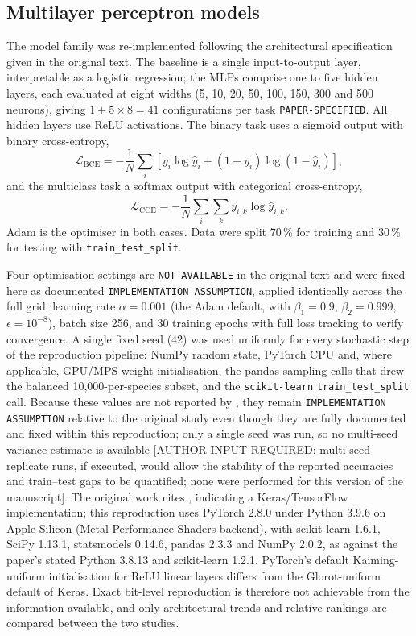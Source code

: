\documentclass[10pt,twocolumn,a4paper]{article}
\newcommand{\evc}[1]{{\footnotesize\texttt{#1}}}
\begin{document}
\subsection{Multilayer perceptron models}
\label{sec:methods-mlp}

The model family was re-implemented following the architectural specification given in the
original text. The baseline is a single
input-to-output layer, interpretable as a logistic regression; the MLPs comprise one to five hidden
layers, each evaluated at eight widths (5, 10, 20, 50, 100, 150, 300 and 500 neurons), giving
$1+5\times8=41$ configurations per task \evc{PAPER-SPECIFIED}. All hidden layers use ReLU
activations. The binary task uses a sigmoid output with binary cross-entropy,
\begin{equation}
\mathcal{L}_{\mathrm{BCE}}=-\frac{1}{N}\sum_{i}\left[y_i\log\hat{y}_i+(1-y_i)\log(1-\hat{y}_i)\right],
\end{equation}
and the multiclass task a softmax output with categorical cross-entropy,
\begin{equation}
\mathcal{L}_{\mathrm{CCE}}=-\frac{1}{N}\sum_{i}\sum_{k}y_{i,k}\log\hat{y}_{i,k}.
\end{equation}
Adam is the optimiser in both cases. Data were split 70\,\% for training and 30\,\% for testing
with \texttt{train\_test\_split}.

Four optimisation settings are \evc{NOT AVAILABLE} in the original text and were fixed here as
documented \evc{IMPLEMENTATION ASSUMPTION}, applied identically across the full grid: learning rate
$\alpha=0.001$ (the Adam default, with $\beta_1=0.9$, $\beta_2=0.999$, $\epsilon=10^{-8}$), batch
size 256, and 30 training epochs with full loss tracking to verify convergence. A single fixed seed
(42) was used uniformly for every stochastic step of the reproduction pipeline: NumPy random state,
PyTorch CPU and, where applicable, GPU/MPS weight initialisation, the pandas sampling calls that
drew the balanced 10{,}000-per-species subset, and the \texttt{scikit-learn}
\texttt{train\_test\_split} call. Because these values are not reported by
\citet{monterrubio2025}, they remain \evc{IMPLEMENTATION ASSUMPTION} relative to the original
study even though they are fully documented and fixed within this reproduction; only a single seed
was run, so no multi-seed variance estimate is available
[AUTHOR INPUT REQUIRED: multi-seed replicate runs, if executed, would allow the stability of the
reported accuracies and train--test gaps to be quantified; none were performed for this version of
the manuscript]. The original work cites \citet{chollet2021}, indicating a Keras/TensorFlow
implementation; this reproduction uses PyTorch 2.8.0 under Python 3.9.6 on Apple Silicon (Metal
Performance Shaders backend), with scikit-learn 1.6.1, SciPy 1.13.1, statsmodels 0.14.6, pandas
2.3.3 and NumPy 2.0.2, as against the paper's stated Python 3.8.13 and scikit-learn 1.2.1. PyTorch's
default Kaiming-uniform initialisation for ReLU linear layers differs from the Glorot-uniform
default of Keras. Exact bit-level reproduction is therefore not achievable from the information
available, and only architectural trends and relative rankings are compared between the two studies.
\end{document}
